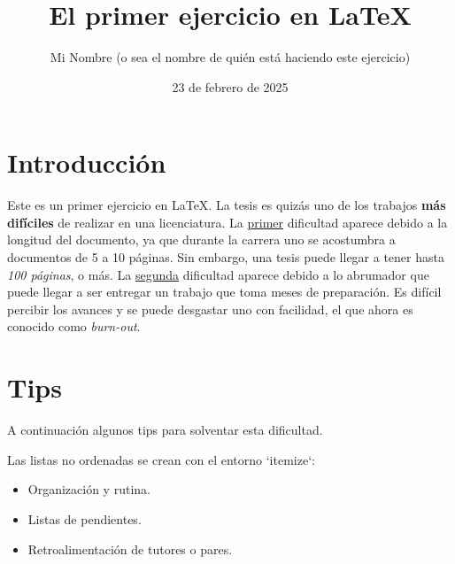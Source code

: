\documentclass[12pt,a4paper]{article} %
\title{El primer ejercicio en \LaTeX}
\author{Mi Nombre (o sea el nombre de quién está haciendo este ejercicio)}
\date{23 de febrero de 2025} %
\begin{document}
\maketitle %

\section{Introducción} %
Este es un primer ejercicio en \LaTeX. 
La tesis es quizás uno de los trabajos \textbf{más difíciles} de realizar en una licenciatura. La \underline{primer} dificultad aparece debido a la longitud del documento, ya que durante la carrera uno se acostumbra a documentos de 5 a 10 páginas. Sin embargo, una tesis puede llegar a tener hasta \textit{100 páginas}, o más. La \underline{segunda} dificultad aparece debido a lo abrumador que puede llegar a ser entregar un trabajo que toma meses de preparación. Es difícil percibir los avances y se puede desgastar uno con facilidad, el que ahora es conocido como \textit{burn-out}. 



\section{Tips} %

A continuación algunos tips para solventar esta dificultad.

Las listas no ordenadas se crean con el entorno `itemize`:
\begin{itemize}
    \item Organización y rutina.
    \item Listas de pendientes.
    \item Retroalimentación de tutores o pares.
\end{itemize}
\end{document}
